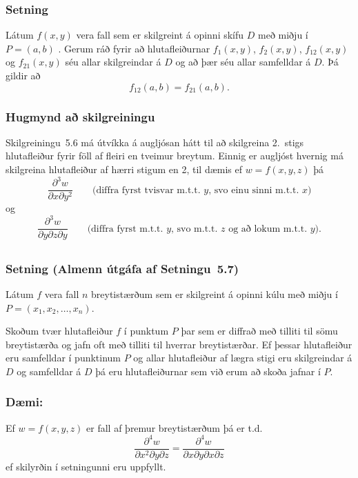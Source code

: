  \subsubsection{Setning }
  Látum $f(x,y)$ vera fall sem er skilgreint á opinni
skífu $D$ með miðju í $P=(a,b)$ .  Gerum ráð fyrir að
hlutafleiðurnar $f_1(x,y)$, $f_2(x,y)$, $f_{12}(x,y)$ og $f_{21}(x,y)$
séu allar skilgreindar á $D$ og að þær séu allar samfelldar á $D$.  Þá
gildir að 
$$f_{12}(a,b)=f_{21}(a,b).$$
 


 \subsubsection{Hugmynd að skilgreiningu }
  Skilgreiningu~5.6 má útvíkka á augljósan hátt
til að skilgreina 2.~stigs hlutafleiður fyrir föll af fleiri en
tveimur breytum.   Einnig er augljóst hvernig má skilgreina
hlutafleiður af hærri stigum en 2, til dæmis ef $w=f(x,y,z)$ þá 
$$\frac{\partial^3 w}{\partial x\partial y^2} \quad\quad\mbox{(diffra
    fyrst tvisvar m.t.t. }y\mbox{, svo einu sinni m.t.t. } x\mbox{)}$$
og 
$$\frac{\partial^3 w}{\partial y\partial z\partial y} \quad\quad\mbox{(diffra
    fyrst m.t.t. } y\mbox{, svo m.t.t. } z
\mbox{ og að lokum m.t.t. }y\mbox{)}.$$

 



\subsection{}
 \subsubsection{Setning  (Almenn útgáfa af Setningu~5.7)}
     Látum $f$ vera
fall $n$ breytistærðum sem er skilgreint á opinni kúlu með miðju í 
$P=(x_1, x_2,\ldots, x_n)$.  

\medskip
Skoðum tvær hlutafleiður $f$ í punktum $P$
þar sem er diffrað með tilliti til sömu breytistærða og jafn oft með
tilliti til hverrar breytistærðar.  Ef þessar hlutafleiður eru
samfelldar í punktinum $P$ og allar hlutafleiður af lægra stigi eru
skilgreindar á $D$ og samfelldar á $D$ þá eru hlutafleiðurnar sem við
erum að skoða jafnar í $P$.
 
\pause
 \subsubsection {Dæmi:} 
 Ef $w = f(x,y,z)$ er fall af þremur breytistærðum þá er t.d.~
 \begin {equation*}
  \frac{\partial^4 w}{\partial x^2\partial y \partial z} = \frac{\partial^4 w}{\partial x \partial y \partial x \partial z}
 \end {equation*}
ef skilyrðin í setningunni eru uppfyllt.
  
